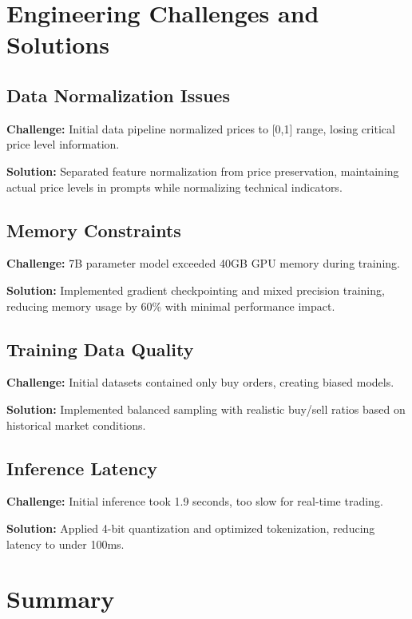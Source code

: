 \documentclass{report}
\begin{document}
\section{Engineering Challenges and Solutions}

\subsection{Data Normalization Issues}

\textbf{Challenge:} Initial data pipeline normalized prices to [0,1] range, losing critical price level information.

\textbf{Solution:} Separated feature normalization from price preservation, maintaining actual price levels in prompts while normalizing technical indicators.

\subsection{Memory Constraints}

\textbf{Challenge:} 7B parameter model exceeded 40GB GPU memory during training.

\textbf{Solution:} Implemented gradient checkpointing and mixed precision training, reducing memory usage by 60\% with minimal performance impact.

\subsection{Training Data Quality}

\textbf{Challenge:} Initial datasets contained only buy orders, creating biased models.

\textbf{Solution:} Implemented balanced sampling with realistic buy/sell ratios based on historical market conditions.

\subsection{Inference Latency}

\textbf{Challenge:} Initial inference took 1.9 seconds, too slow for real-time trading.

\textbf{Solution:} Applied 4-bit quantization and optimized tokenization, reducing latency to under 100ms.

\section{Summary}
\end{document}
